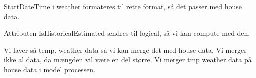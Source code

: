 StartDateTime i weather formateres til rette format, så det passer med house data. 

Attributen IsHistoricalEstimated ændres til logical, så vi kan compute med den. 

Vi laver så temp. weather data så vi kan merge det med house data. 
Vi merger ikke al data, da mængden vil være en del større. Vi merger tmp weather data på house data i model processen. 


